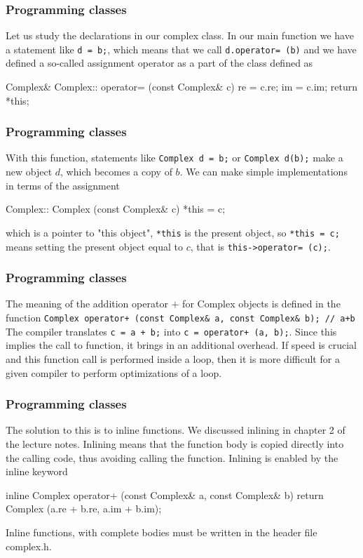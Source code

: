 \documentclass[handout]{beamer}
\begin{document}
\begin{frame}
\frametitle{Programming classes}

Let us study the declarations in our complex class.
In our main function we have a statement like \Verb!d = b;!, which means
that we call \Verb!d.operator= (b)! and we have defined a so-called assignment operator
as a part of the class defined as

\begin{print}
Complex& Complex:: operator= (const Complex& c)
{
   re = c.re;
   im = c.im;
   return *this;
}
\end{print}
\end{frame}

\begin{frame}
\frametitle{Programming classes}

With this function, statements like
\Verb!Complex d = b;! or \Verb!Complex d(b);!
make a new object $d$, which becomes a copy of $b$.
We can make simple implementations in terms of the assignment

\begin{print}
Complex:: Complex (const Complex& c)
{ *this = c; }
\end{print}
which  is a pointer to "this object", \Verb!*this! is the present object,
so \Verb!*this = c;! means setting the present object equal to $c$, that is
\Verb!this->operator= (c);!.
\end{frame}

\begin{frame}
\frametitle{Programming classes}

The meaning of the addition operator $+$ for Complex objects is defined in the
function
\Verb!Complex operator+ (const Complex& a, const Complex& b); // a+b!
The compiler translates \Verb!c = a + b;! into \Verb!c = operator+ (a, b);!.
Since this implies the call to function, it brings in an additional overhead. If speed
is crucial and this function call is performed inside a loop, then it is more difficult for a
given compiler to perform optimizations of a loop.
\end{frame}

\begin{frame}
\frametitle{Programming classes}

The solution to this is to inline functions.   We discussed inlining in chapter
2 of the lecture notes.
Inlining means that the function body is copied directly into
the calling code, thus avoiding calling the function.
Inlining is enabled by the inline keyword

\begin{print}
inline Complex operator+ (const Complex& a, const Complex& b)
{ return Complex (a.re + b.re, a.im + b.im); }
\end{print}
Inline functions, with complete bodies must be written in the header file  complex.h.
\end{frame}
\end{document}
